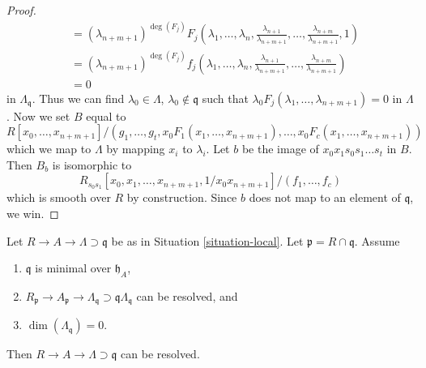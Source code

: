 \begin{proof}
\begin{align*}
& =
(\lambda_{n + m + 1})^{\deg(F_j)} F_j(\lambda_1, \ldots, \lambda_n,
\frac{\lambda_{n + 1}}{\lambda_{n + m + 1}}, \ldots,
\frac{\lambda_{n + m}}{\lambda_{n + m + 1}}, 1) \\
& =
(\lambda_{n + m + 1})^{\deg(F_j)} f_j(\lambda_1, \ldots, \lambda_n,
\frac{\lambda_{n + 1}}{\lambda_{n + m + 1}}, \ldots,
\frac{\lambda_{n + m}}{\lambda_{n + m + 1}}) \\
& = 0
\end{align*}
in $\Lambda_\mathfrak q$. Thus we can find
$\lambda_0 \in \Lambda$, $\lambda_0 \not \in \mathfrak q$ such that
$\lambda_0 F_j(\lambda_1, \ldots, \lambda_{n + m + 1}) = 0$
in $\Lambda$. Now we set $B$ equal to
$$
R[x_0, \ldots, x_{n + m + 1}]/
(g_1, \ldots, g_t, x_0F_1(x_1, \ldots, x_{n + m + 1}), \ldots,
x_0F_c(x_1, \ldots, x_{n + m + 1}))
$$
which we map to $\Lambda$ by mapping $x_i$ to $\lambda_i$.
Let $b$ be the image of $x_0 x_1 s_0 s_1 \ldots s_t$ in $B$.
Then $B_b$ is isomorphic to
$$
R_{s_0s_1}[x_0, x_1, \ldots, x_{n + m + 1}, 1/x_0x_{n + m + 1}]/
(f_1, \ldots, f_c)
$$
which is smooth over $R$ by construction.
Since $b$ does not map to an element of $\mathfrak q$, we win.
\end{proof}

\begin{lemma}
\label{lemma-delocalize-height-zero}
Let $R \to A \to \Lambda \supset \mathfrak q$ be as in
Situation \ref{situation-local}. Let $\mathfrak p = R \cap \mathfrak q$.
Assume
\begin{enumerate}
\item $\mathfrak q$ is minimal over $\mathfrak h_A$,
\item $R_\mathfrak p \to A_\mathfrak p \to \Lambda_\mathfrak q
\supset \mathfrak q\Lambda_\mathfrak q$ can be resolved, and
\item $\dim(\Lambda_\mathfrak q) = 0$.
\end{enumerate}
Then $R \to A \to \Lambda \supset \mathfrak q$ can be resolved.
\end{lemma}

